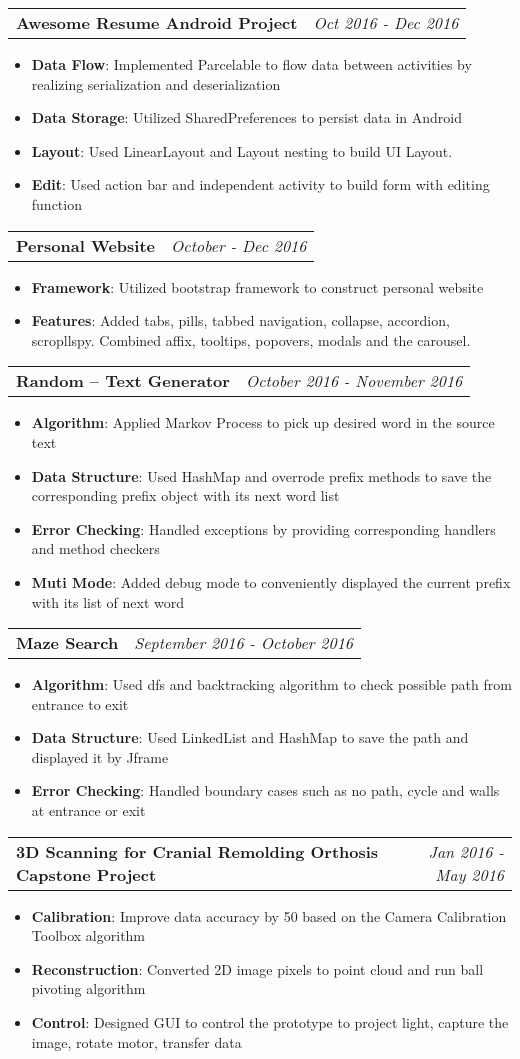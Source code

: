 \documentclass[letterpaper,11pt]{article}
\makeatletter
\newcommand{\resumeItem}[2]{
  \item\small{
    \textbf{#1}{: #2 \vspace{-2pt}}
  }
}
\newcommand{\resumeSubheadingtwo}[2]{
  \vspace{-1pt}\item
    \begin{tabular*}{0.97\textwidth}{l@{\extracolsep{\fill}}r}
      \textbf{#1} & \textit{\small#2} \\
    \end{tabular*}\vspace{-5pt}
}
\newcommand{\resumeItemListStart}{\begin{itemize}}
\newcommand{\resumeItemListEnd}{\end{itemize}\vspace{-5pt}}
\makeatother
\begin{document}
    \resumeSubheadingtwo
      {Awesome Resume Android Project }{Oct 2016 - Dec 2016}
      \resumeItemListStart
        \resumeItem{Data Flow}
          {Implemented Parcelable to flow data between activities by realizing serialization and deserialization}
        \resumeItem{Data Storage}
          {Utilized SharedPreferences to persist data in Android}
        \resumeItem{Layout}
          {Used LinearLayout and Layout nesting to build UI Layout.}
        \resumeItem{Edit}
          {Used action bar and independent activity to build form with editing function}
      \resumeItemListEnd
   \resumeSubheadingtwo
      {Personal Website}{October - Dec 2016}
      \resumeItemListStart
        \resumeItem{Framework}
          {Utilized bootstrap framework to construct personal website }
        \resumeItem{Features}
          {Added tabs, pills, tabbed navigation, collapse, accordion, scropllspy. Combined affix, tooltips, popovers, modals and the carousel.}
      \resumeItemListEnd      
    \resumeSubheadingtwo
      {Random – Text Generator}{October 2016 - November 2016}
      \resumeItemListStart
        \resumeItem{Algorithm}
          {Applied Markov Process to pick up desired word in the source text}
        \resumeItem{Data Structure}
          {Used HashMap and overrode prefix methods to save the corresponding prefix object with its next word list}
        \resumeItem{Error Checking}
          {Handled exceptions by providing corresponding handlers and method checkers}
        \resumeItem{Muti Mode}
          {Added debug mode to conveniently displayed the current prefix with its list of next word}
      \resumeItemListEnd
   \resumeSubheadingtwo
      {Maze Search }{September 2016 - October 2016}
      \resumeItemListStart
        \resumeItem{Algorithm}
          {Used dfs and backtracking algorithm to check possible path from entrance to exit }
        \resumeItem{Data Structure}
          {Used LinkedList and HashMap to save the path and displayed it by Jframe}
        \resumeItem{Error Checking}
          {Handled boundary cases such as no path, cycle and walls at entrance or exit }
      \resumeItemListEnd
    \resumeSubheadingtwo
      {3D Scanning for Cranial Remolding Orthosis Capstone Project }{Jan 2016 - May 2016}
      \resumeItemListStart
        \resumeItem{Calibration}
          {Improve data accuracy by 50 based on the Camera Calibration Toolbox algorithm }
        \resumeItem{Reconstruction}
          {Converted 2D image pixels to point cloud and run ball pivoting algorithm}
        \resumeItem{Control}
          {Designed GUI to control the prototype to project light, capture the image, rotate motor, transfer data }
      \resumeItemListEnd
\end{document}

